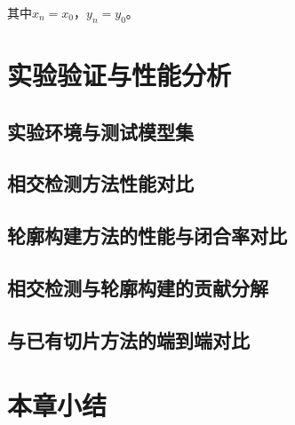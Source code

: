 其中$x_{n}=x_{0}$，$y_{n}=y_{0}$。

\section{实验验证与性能分析}\label{sec:exp}

\subsection{实验环境与测试模型集}

\subsection{相交检测方法性能对比}

\subsection{轮廓构建方法的性能与闭合率对比}

\subsection{相交检测与轮廓构建的贡献分解}

\subsection{与已有切片方法的端到端对比}

\section{本章小结}\label{sec:summary}
